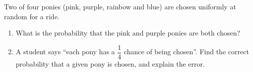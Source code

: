 Two of four ponies (pink, purple, rainbow and blue) are chosen uniformly at random for a ride.
\begin{enumerate}
\item[(a)] What is the probability that the pink and purple ponies are both chosen?
\item[(b)] A student says ``each pony has a $\dfrac14$ chance of being chosen''. Find the correct probability that a given pony is chosen, and explain the error.
\end{enumerate}
